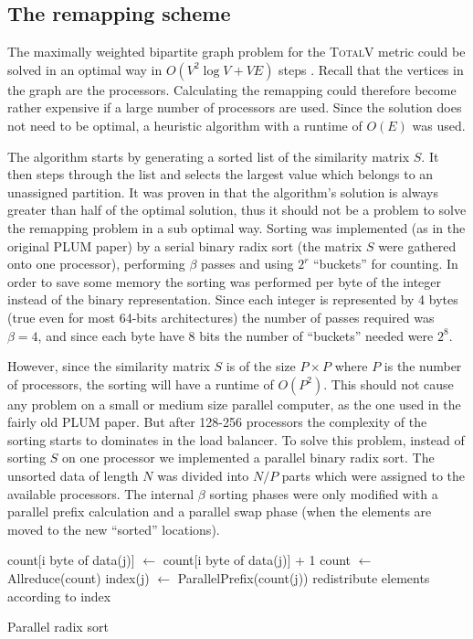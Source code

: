 \subsection{The remapping scheme}

The maximally weighted bipartite graph problem for the \textsc{TotalV}
metric could be solved in an optimal way in $O(V^2 \log V + V E)$
steps \cite{Oliker1998}. Recall that the vertices in the graph are the
processors. Calculating the remapping could therefore become rather
expensive if a large number of processors are used. Since the solution
does not need to be optimal, a heuristic algorithm with a runtime of
$O(E)$ was used.

The algorithm starts by generating a sorted list of the similarity
matrix $S$. It then steps through the list and selects the largest
value which belongs to an unassigned partition. It was proven in
\cite{Oliker1998} that the algorithm's solution is always greater than
half of the optimal solution, thus it should not be a problem to solve
the remapping problem in a sub optimal way. Sorting was implemented
(as in the original PLUM paper) by a serial binary radix sort (the
matrix $S$ were gathered onto one processor), performing $\beta$
passes and using $2^r$ ``buckets'' for counting. In order to save some
memory the sorting was performed per byte of the integer instead of
the binary representation. Since each integer is represented by 4
bytes (true even for most 64-bits architectures) the number of passes
required was $\beta = 4$, and since each byte have 8 bits the number
of ``buckets'' needed were $2^8$.

However, since the similarity matrix $S$ is of the size $P \times P$
where $P$ is the number of processors, the sorting will have a runtime
of $O(P^2)$. This should not cause any problem on a small or medium
size parallel computer, as the one used in the fairly old PLUM
paper. But after 128-256 processors the complexity of the sorting
starts to dominates in the load balancer. To solve this problem,
instead of sorting $S$ on one processor we implemented a parallel
binary radix sort. The unsorted data of length $N$ was divided into
$N/P$ parts which were assigned to the available processors. The
internal $\beta$ sorting phases were only modified with a parallel
prefix calculation and a parallel swap phase (when the elements are
moved to the new ``sorted'' locations).
\begin{algorithm}
  \begin{algorithmic}
    \State count[i byte of data(j)] $\leftarrow$ count[i byte of data(j)] + 1
    \EndFor
    \State count $\leftarrow$ Allreduce(count)
    \State index(j) $\leftarrow$ ParallelPrefix(count(j))
    \EndFor
    \State redistribute elements according to index
    \EndFor
     \end{algorithmic}
  \caption{Parallel radix sort}
  \label{hoffman-4:alg:pradix}
\end{algorithm}


